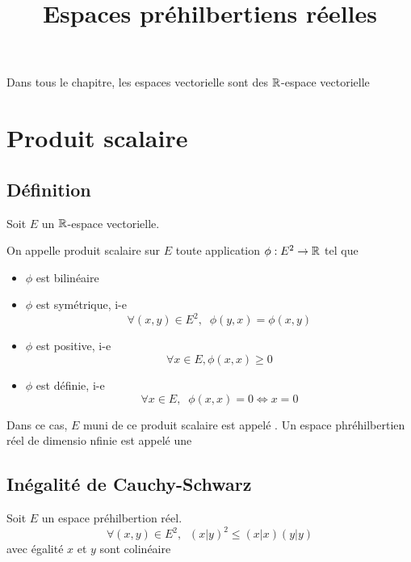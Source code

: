 

\title{Espaces préhilbertiens réelles}



\maketitle
\tableofcontents

\pagebreak

Dans tous le chapitre, les espaces vectorielle sont des $\mathbb{R}$-espace
vectorielle

\section{Produit scalaire}

\subsection{Définition}

\begin{dfn}
Soit $E$ un $\mathbb{R}$-espace vectorielle.

On appelle produit scalaire sur $E$ toute application $\phi : E^2 \to \mathbb{R}$
tel que
\begin{itemize}
    \item $\phi$ est bilinéaire
    \item $\phi$ est symétrique, i-e
    \[
        \forall (x, y) \in E^2, \;\; \phi(y, x) = \phi(x, y)
    \]
    \item $\phi$ est positive, i-e
    \[
        \forall x \in E, \phi(x, x) \geq 0
    \]
    \item $\phi$ est définie, i-e
    \[
        \forall x \in E, \;\; \phi(x, x) = 0 \iff x = 0
    \]
\end{itemize}

Dans ce cas, $E$ muni de ce produit scalaire est appelé . Un espace phréhilbertien réel de dimensio nfinie est
appelé une 
\end{dfn}

\subsection{Inégalité de Cauchy-Schwarz}

\begin{prp}
Soit $E$ un espace préhilbertion réel.
\[
    \forall (x, y) \in E^2, \;\; (x|y)^2 \leq (x|x)(y|y)
\]
avec égalité \ssi $x$ et $y$ sont colinéaire
\end{prp}


